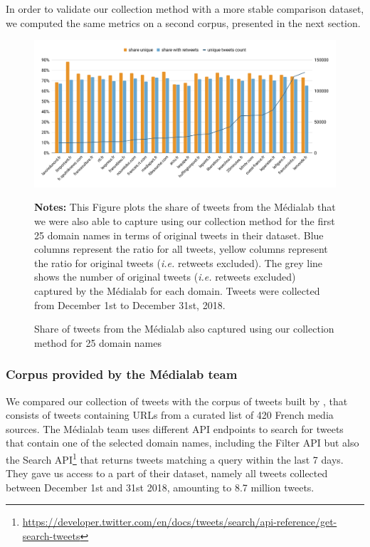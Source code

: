 In order to validate our collection method with a more stable comparison dataset, we computed the same metrics on a second corpus, presented in the next section.
\begin{figure}
\begin{center}
\includegraphics[width=1\textwidth]{figures/ShareInCommonWithMedialab.pdf}
\end{center}
\scriptsize \textbf{Notes:} This Figure plots the share of tweets from the Médialab that we were also able to capture using our collection method for the first 25 domain names in terms of original tweets in their dataset. Blue columns represent the ratio for all tweets, yellow columns represent the ratio for original tweets (\textit{i.e.} retweets excluded). The grey line shows the number of original tweets (\textit{i.e.} retweets excluded) captured by the Médialab for each domain. Tweets were collected from December 1st to December 31st, 2018.

\caption{Share of tweets from the Médialab also captured using our collection method for 25 domain names}
\label{Figure:HistogramUrlsMedialab}
\end{figure}
\subsubsection{Corpus provided by the Médialab team}

We compared our collection of tweets with the corpus of tweets built by \citet{cardon2019unfolding}, that consists of
tweets containing URLs from a curated list of 420 French media sources. The Médialab team uses different API endpoints to search for tweets that contain one of the selected domain names, including the Filter API but also the Search API\footnote{\url{https://developer.twitter.com/en/docs/tweets/search/api-reference/get-search-tweets}} that returns tweets matching a query within the last 7 days. They gave us access to a part of their dataset, namely all tweets collected between December 1st and 31st 2018, amounting to 8.7 million tweets. 

